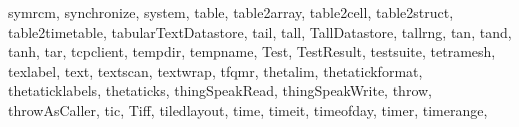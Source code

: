 {{        symrcm,%
        synchronize,%
        system,%
        table,%
        table2array,%
        table2cell,%
        table2struct,%
        table2timetable,%
        tabularTextDatastore,%
        tail,%
        tall,%
        TallDatastore,%
        tallrng,%
        tan,%
        tand,%
        tanh,%
        tar,%
        tcpclient,%
        tempdir,%
        tempname,%
        Test,%
        TestResult,%
        testsuite,%
        tetramesh,%
        texlabel,%
        text,%
        textscan,%
        textwrap,%
        tfqmr,%
        thetalim,%
        thetatickformat,%
        thetaticklabels,%
        thetaticks,%
        thingSpeakRead,%
        thingSpeakWrite,%
        throw,%
        throwAsCaller,%
        tic,%
        Tiff,%
        tiledlayout,%
        time,%
        timeit,%
        timeofday,%
        timer,%
        timerange,%
}}
